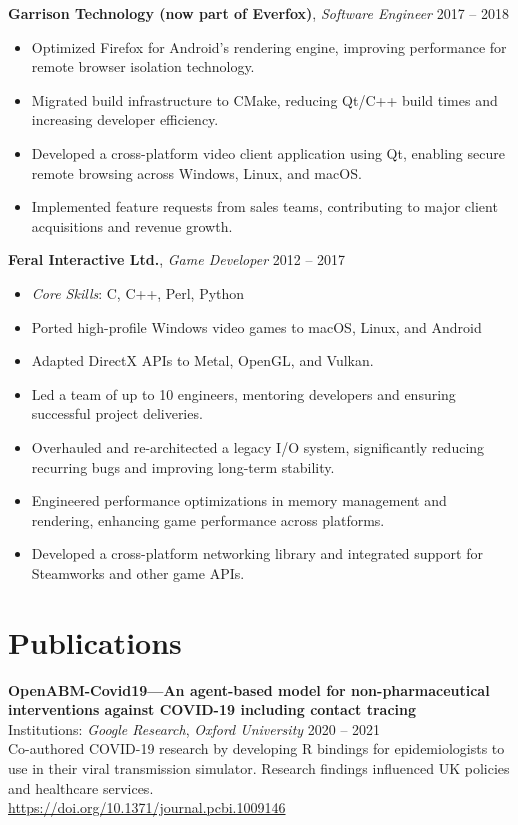 \documentclass[a4paper,10pt]{article}
\newcommand{\coreskills}[1]{\item \textit{Core Skills}: #1}
\begin{document}
{\begin{minipage}[t]{0.72\textwidth}
    \textbf{Garrison Technology (now part of Everfox)}, \textit{Software Engineer} \hfill 2017 -- 2018
    \begin{itemize}[leftmargin=1.5em, nosep]
        \item Optimized Firefox for Android’s rendering engine, improving performance for remote browser isolation technology.
        \item Migrated build infrastructure to CMake, reducing Qt/C++ build times and increasing developer efficiency.
        \item Developed a cross-platform video client application using Qt, enabling secure remote browsing across Windows, Linux, and macOS.
        \item Implemented feature requests from sales teams, contributing to major client acquisitions and revenue growth.
    \end{itemize}
    \vspace{0.5em}

    \textbf{Feral Interactive Ltd.}, \textit{Game Developer} \hfill 2012 -- 2017
    \begin{itemize}[leftmargin=1.5em, nosep]
        \coreskills{C, C++, Perl, Python}
        \item Ported high-profile Windows video games to macOS, Linux, and Android
        \item Adapted DirectX APIs to Metal, OpenGL, and Vulkan.
        \item Led a team of up to 10 engineers, mentoring developers and ensuring successful project deliveries.
        \item Overhauled and re-architected a legacy I/O system, significantly reducing recurring bugs and improving long-term stability.
        \item Engineered performance optimizations in memory management and rendering, enhancing game performance across platforms.
        \item Developed a cross-platform networking library and integrated support for Steamworks and other game APIs.
    \end{itemize}

    \section*{\color{navy} Publications}
    \textbf{OpenABM-Covid19—An agent-based model for non-pharmaceutical interventions against COVID-19 including contact tracing}\\
    Institutions: \textit{Google Research}, \textit{Oxford University} \hfill 2020 -- 2021\\[1.0em]
    Co-authored COVID-19 research by developing R bindings for epidemiologists to use in their viral transmission simulator. Research findings influenced UK policies and healthcare services.\\
    \href{https://doi.org/10.1371/journal.pcbi.1009146}{https://doi.org/10.1371/journal.pcbi.1009146}
\end{minipage}%
\vfill %
}%
\end{document}
